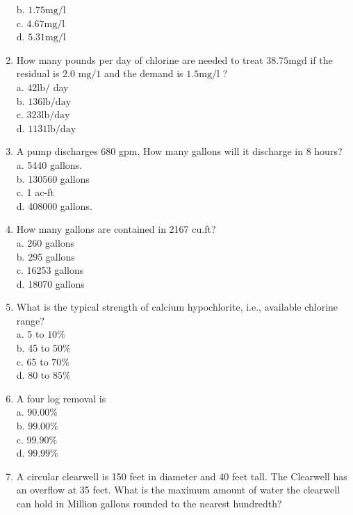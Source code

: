 \begin{enumerate}
b. $1.75 \mathrm{mg} / \mathrm{l}$\\
c. $4.67 \mathrm{mg} / \mathrm{l}$\\
d. $5.31 \mathrm{mg} / \mathrm{l}$\\
\item How many pounds per day of chlorine are needed to treat $38.75 \mathrm{mgd}$ if the residual is 2.0 $\mathrm{mg} / 1$ and the demand is $1.5 \mathrm{mg} / \mathrm{l}$ ?\\
a. $42 \mathrm{lb} /$ day\\
b. $136 \mathrm{lb} / \mathrm{day}$\\
c. $323 \mathrm{lb} / \mathrm{day}$\\
d. $1131 \mathrm{lb} / \mathrm{day}$ 

\item A pump discharges 680 gpm, How many gallons will it discharge in 8 hours?\\
a. 5440 gallons.\\
b. 130560 gallons\\
c. 1 ac-ft\\
d. 408000 gallons.\\
\item How many gallons are contained in 2167 cu.ft?\\
a. 260 gallons\\
b. 295 gallons\\
c. 16253 gallons\\
d. 18070 gallons\\
\item What is the typical strength of calcium hypochlorite, i.e., available chlorine range?\\
a. 5 to $10 \%$\\
b. 45 to $50 \%$\\
c. 65 to $70 \%$\\
d. 80 to $85 \%$\\
\item A four log removal is\\
a. $90.00 \%$\\
b. $99.00 \%$\\
c. $99.90 \%$\\
d. $99.99 \%$\\
\item A circular clearwell is 150 feet in diameter and 40 feet tall. The Clearwell has an overflow at 35 feet. What is the maximum amount of water the clearwell can hold in Million gallons rounded to the nearest hundredth?\\

\end{enumerate}

